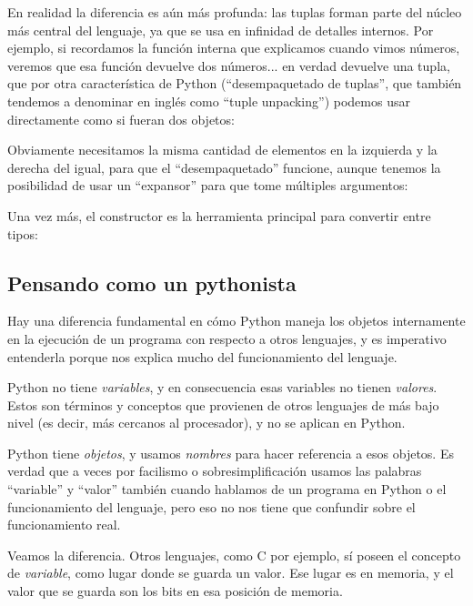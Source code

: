 En realidad la diferencia es aún más profunda: las tuplas forman parte del núcleo más central del lenguaje, ya que se usa en infinidad de detalles internos. Por ejemplo, si recordamos la función interna  que explicamos cuando vimos números, veremos que esa función devuelve dos números... en verdad devuelve una tupla, que por otra característica de Python (``desempaquetado de tuplas'', que también tendemos a denominar en inglés como ``tuple unpacking'') podemos usar directamente como si fueran dos objetos:


Obviamente necesitamos la misma cantidad de elementos en la izquierda y la derecha del igual, para que el ``desempaquetado'' funcione, aunque tenemos la posibilidad de usar un ``expansor'' para que tome múltiples argumentos:


Una vez más, el constructor es la herramienta principal para convertir entre tipos:



\subsection{Pensando como un pythonista}\label{sub:pensando-pythonista}

Hay una diferencia fundamental en cómo Python maneja los objetos internamente en la ejecución de un programa con respecto a otros lenguajes, y es imperativo entenderla porque nos explica mucho del funcionamiento del lenguaje.

Python no tiene \textit{variables}, y en consecuencia esas variables no tienen \textit{valores}. Estos son términos y conceptos que provienen de otros lenguajes de más bajo nivel (es decir, más cercanos al procesador), y no se aplican en Python. 

Python tiene \textit{objetos}, y usamos \textit{nombres} para hacer referencia a esos objetos. Es verdad que a veces por facilismo o sobresimplificación usamos las palabras ``variable'' y ``valor'' también cuando hablamos de un programa en Python o el funcionamiento del lenguaje, pero eso no nos tiene que confundir sobre el funcionamiento real.

Veamos la diferencia. Otros lenguajes, como C por ejemplo, sí poseen el concepto de \textit{variable}, como lugar donde se guarda un valor. Ese lugar es en memoria, y el valor que se guarda son los bits en esa posición de memoria.

